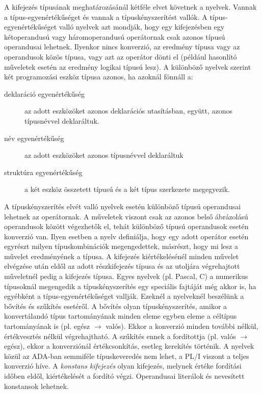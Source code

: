 A kifejezés típusának meghatározásánál kétféle elvet követnek a nyelvek. Vannak a típus-egyenértékűséget és vannak a típuskényszerítést vallók. A típus-egyenértékűséget valló nyelvek azt mondják, hogy egy kifejezésben egy kétoperandusú vagy háromoperandusú operátornak csak azonos típusú operandusai lehetnek. Ilyenkor nincs konverzió, az eredmény típusa vagy az operandusok közös
típusa, vagy azt az operátor dönti el (például hasonlító műveletek esetén az eredmény logikai típusú lesz). A különböző nyelvek szerint két programozási eszköz típusa azonos, ha azoknál fönnáll a:
\begin{description}
\item[deklaráció egyenértékűség] az adott eszközöket azonos deklarációs utasításban, együtt, azonos típusnévvel deklaráltuk.
\item[név egyenértékűség] az adott eszközöket azonos típusnévvel deklaráltuk
\item[struktúra egyenértékűség] a két eszköz összetett típusú és a két típus szerkezete megegyezik.
\end{description}
A típuskényszerítés elvét valló nyelvek esetén különböző típusú operandusai lehetnek az operátornak. A műveletek viszont csak az azonos belső ábrázolású operandusok között végezhetők el, tehát különböző típusú operandusok esetén konverzió van. Ilyen esetben a nyelv definiálja, hogy egy adott operátor esetén egyrészt milyen típuskombinációk megengedettek, másrészt, hogy mi lesz a művelet
eredményének a típusa. A kifejezés kiértékelésénél minden művelet elvégzése után eldől az adott részkifejezés típusa és az utoljára végrehajtott műveletnél pedig a kifejezés típusa. Egyes nyelvek (pl. Pascal, C) a numerikus típusoknál megengedik a típuskényszerítés egy speciális fajtáját még akkor is, ha egyébként a típus-egyenértékűséget vallják. Ezeknél a nyelveknél beszélünk a bővítés és szűkítés esetéről. A bővítés olyan típuskényszerítés, amikor a konvertálandó típus tartományának minden eleme egyben eleme a céltípus tartományának is (pl. egész $\rightarrow$ valós). Ekkor a konverzió minden további nélkül, értékvesztés nélkül végrehajtható. A szűkítés ennek a fordítottja (pl. valós $\rightarrow$ egész), ekkor a konverziónál értékcsonkítás, esetleg kerekítés történik. A nyelvek közül az ADA-ban semmiféle típuskeveredés nem lehet, a PL/I viszont a teljes konverzió híve.
A \emph{konstans kifejezés} olyan kifejezés, melynek értéke fordítási időben eldől, kiértékelését a fordító végzi. Operandusai literálok és nevesített konstansok lehetnek.

